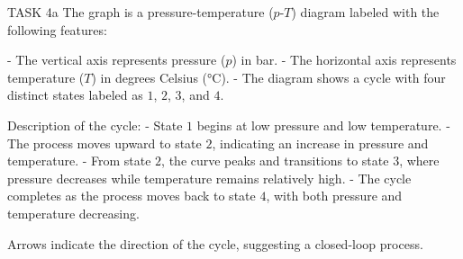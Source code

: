 TASK 4a  
The graph is a pressure-temperature (\( p \)-\( T \)) diagram labeled with the following features:  

- The vertical axis represents pressure (\( p \)) in bar.  
- The horizontal axis represents temperature (\( T \)) in degrees Celsius (\( \text{°C} \)).  
- The diagram shows a cycle with four distinct states labeled as \( 1 \), \( 2 \), \( 3 \), and \( 4 \).  

Description of the cycle:  
- State \( 1 \) begins at low pressure and low temperature.  
- The process moves upward to state \( 2 \), indicating an increase in pressure and temperature.  
- From state \( 2 \), the curve peaks and transitions to state \( 3 \), where pressure decreases while temperature remains relatively high.  
- The cycle completes as the process moves back to state \( 4 \), with both pressure and temperature decreasing.  

Arrows indicate the direction of the cycle, suggesting a closed-loop process.
